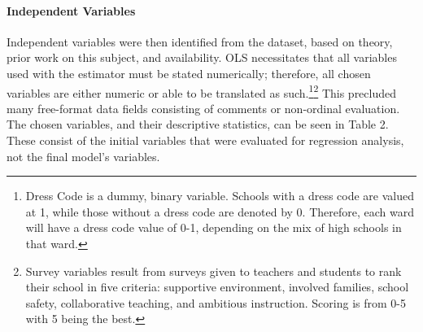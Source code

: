 \documentclass[12pt]{article}
\begin{document}
\paragraph{Independent Variables}
Independent variables were then identified from the dataset, based on theory, prior work on this subject, and availability.  OLS necessitates that all variables used with the estimator must be stated numerically; therefore, all chosen variables are either numeric or able to be translated as such.\footnote{Dress Code is a dummy, binary variable.  Schools with a dress code are valued at 1, while those without a dress code are denoted by 0.  Therefore, each ward will have a dress code value of 0-1, depending on the mix of high schools in that ward.}\footnote{Survey variables result from surveys given to teachers and students to rank their school in five criteria:  supportive environment, involved families, school safety, collaborative teaching, and ambitious instruction.  Scoring is from 0-5 with 5 being the best.}  This precluded many free-format data fields consisting of comments or non-ordinal evaluation.  The chosen variables, and their descriptive statistics, can be seen in Table 2.  These consist of the initial variables that were evaluated for regression analysis, not the final model's variables.
\end{document}
